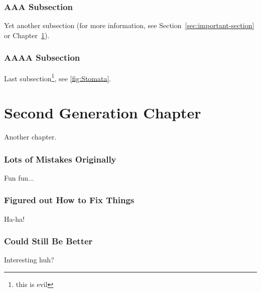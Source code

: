 \documentclass[letterpaper,12pt]{article}
\begin{document}
\subsection{AAA Subsection}
Yet another subsection (for more information, see Section~\ref{sec:important-section} or Chapter~\ref{cha:important-chapter}).

\subsection{AAAA Subsection}
Last subsection\footnote{this is evil}, see \ref{fig:Stomata}.


% 
% 
% 
% 



\chapter{Second Generation Chapter}
\label{cha:important-chapter}
Another chapter.

\subsection{Lots of Mistakes Originally}
Fun fun...

\subsection{Figured out How to Fix Things}
Ha-ha!

\subsection{Could Still Be Better}
Interesting huh?
\end{document}
